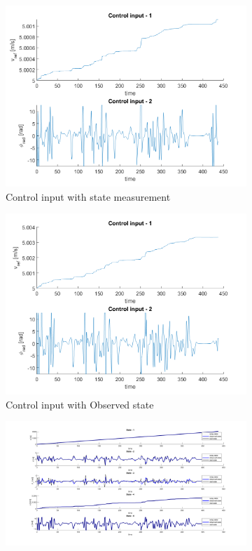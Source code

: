 \begin{figure}[H]
\begin{subfigure}[b]{0.47\textwidth}
         \centering
         \includegraphics[width=\textwidth]{Latex report/image/ex2/input1.png}
         \caption{Control input with state measurement}
         \label{fig:input21}
     \end{subfigure}
     \begin{subfigure}[b]{0.47\textwidth}
         \centering
         \includegraphics[width=\textwidth]{Latex report/image/ex2/input.png}
         \caption{Control input with Observed state}
         \label{fig:input22}
     \end{subfigure}
     \begin{subfigure}[b]{0.95\textwidth}
         \centering
         \includegraphics[width=\textwidth]{Latex report/image/ex2/obs.png}

\end{subfigure}
\end{figure}
